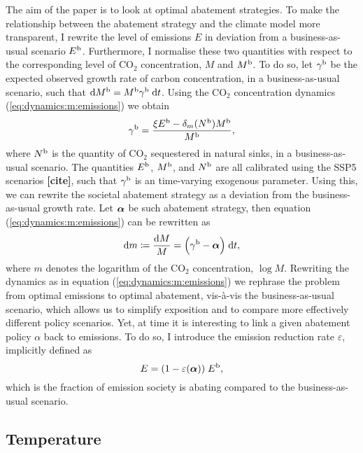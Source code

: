 \documentclass[../../main.tex]{subfiles}
\begin{document}
The aim of the paper is to look at optimal abatement strategies. To make the relationship between the abatement strategy and the climate model more transparent, I rewrite the level of emissions $E$ in deviation from a business-as-usual scenario $E^{\mathrm{b}}$. Furthermore, I normalise these two quantities with respect to the corresponding level of CO$_2$ concentration, $M$ and $M^{\mathrm{b}}$. To do so, let $\gamma^{\mathrm{b}}$ be the expected observed growth rate of carbon concentration, in a business-as-usual scenario, such that $\mathrm{d}M^{\mathrm{b}} = M^{\mathrm{b}} \gamma^{\mathrm{b}} \; \mathrm{d}t$. Using the CO$_2$ concentration dynamics (\ref{eq:dynamics:m:emissions}) we obtain \begin{equation} \label{eq:growth-rate-bau}
    \gamma^{\mathrm{b}} = \frac{\xi E^{\mathrm{b}} - \delta_m(N^{\mathrm{b}}) M^{\mathrm{b}}}{M^{\mathrm{b}}},
\end{equation} where $N^{\mathrm{b}}$ is the quantity of CO$_2$ sequestered in natural sinks, in a business-as-usual scenario. The quantities $E^{\mathrm{b}}$, $M^{\mathrm{b}}$, and $N^{\mathrm{b}}$ are all calibrated using the SSP5 scenarios \textbf{[cite]}, such that $\gamma^{\mathrm{b}}$ is an time-varying exogenous parameter. Using this, we can rewrite the societal abatement strategy as a deviation from the business-as-usual growth rate. Let $\bm{\alpha}$ be such abatement strategy, then equation (\ref{eq:dynamics:m:emissions}) can be rewritten as \begin{equation} \label{eq:dynamics:m:abatement}
    \mathrm{d}m \coloneqq \frac{\mathrm{d}M}{M} = \Big( \gamma^{\mathrm{b}} - \bm{\alpha} \Big)\; \mathrm{d}t,
\end{equation} where $m$ denotes the logarithm of the CO$_2$ concentration, $\log M$. Rewriting the dynamics as in equation (\ref{eq:dynamics:m:emissions}) we rephrase the problem from optimal emissions to optimal abatement, vis-à-vis the business-as-usual scenario, which allows us to simplify exposition and to compare more effectively different policy scenarios. Yet, at time it is interesting to link a given abatement policy $\alpha$ back to emissions. To do so, I introduce the emission reduction rate $\varepsilon$, implicitly defined as \begin{equation} \label{eq:emission-reduction-rate}
    E = (1 - \varepsilon(\bm{\alpha})) \; E^{\mathrm{b}},
\end{equation} which is the fraction of emission society is abating compared to the business-as-usual scenario.

\subsection{Temperature}
\end{document}
